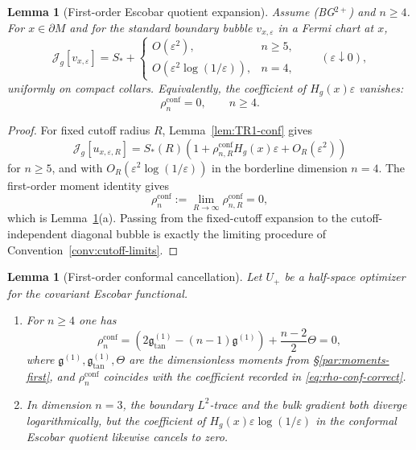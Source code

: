 \documentclass[11pt,reqno,a4paper]{amsart}
\numberwithin{equation}{section}
\theoremstyle{plain}
\newtheorem{lemma}[theorem]{Lemma}
\theoremstyle{remark}
\theoremstyle{plain}
\begin{document}
\begin{lemma}[First-order Escobar quotient expansion]\label{lem:Esc-first-order}
Assume \textup{(BG$^{2+}$)} and $n\ge4$.  For $x\in\partial M$ and for the
standard boundary bubble $v_{x,\varepsilon}$ in a Fermi chart at $x$,
\begin{equation}\label{eq:Esc-first-order}
  \mathcal J_g[v_{x,\varepsilon}]
  = S_\ast+
  \begin{cases}
  O(\varepsilon^2), & n\ge5,\\[1mm]
  O\!\left(\varepsilon^2\log(1/\varepsilon)\right), & n=4,
  \end{cases}
  \qquad (\varepsilon\downarrow0),
\end{equation}
uniformly on compact collars.  Equivalently, the coefficient of
$H_g(x)\varepsilon$ vanishes:
\begin{equation}\label{eq:rho-zero}
\rho_n^{\mathrm{conf}}=0,\qquad n\ge4.
\end{equation}
\end{lemma}

\begin{proof}
For fixed cutoff radius $R$, Lemma~\ref{lem:TR1-conf} gives
\[
\mathcal J_g[u_{x,\varepsilon,R}]
=
S_\ast(R)
\left(
1+\rho_{n,R}^{\mathrm{conf}}H_g(x)\varepsilon
+
O_R(\varepsilon^2)
\right)
\]
for $n\ge5$, and with $O_R(\varepsilon^2\log(1/\varepsilon))$ in the
borderline dimension $n=4$.  The first-order moment identity gives
\[
\rho_n^{\mathrm{conf}}
:=
\lim_{R\to\infty}\rho_{n,R}^{\mathrm{conf}}
=
0,
\]
which is Lemma~\ref{lem:rho-positive}\textup{(a)}.  Passing from the
fixed-cutoff expansion to the cutoff-independent diagonal bubble is exactly
the limiting procedure of Convention~\ref{conv:cutoff-limits}.
\end{proof}


\begin{lemma}[First-order conformal cancellation]\label{lem:rho-positive}
Let $U_+$ be a half-space optimizer for the covariant Escobar functional.

\begin{enumerate}[label=(\alph*),leftmargin=1.25em]
\item For $n\ge4$ one has
\begin{equation}\label{eq:rho-final-closed}
\rho_n^{\mathrm{conf}}
=\left(2\mathfrak g^{(1)}_{\tan}-(n-1)\mathfrak g^{(1)}\right)+\frac{n-2}{2}\Theta
= 0,
\end{equation}
where $\mathfrak g^{(1)},\mathfrak g^{(1)}_{\tan},\Theta$ are the dimensionless moments from \S\ref{par:moments-first}, and $\rho_n^{\mathrm{conf}}$ coincides with the coefficient recorded in \eqref{eq:rho-conf-correct}.

\item In dimension $n=3$, the boundary $L^2$-trace and the bulk gradient both
diverge logarithmically, but the coefficient of
$H_g(x)\varepsilon\log(1/\varepsilon)$ in the conformal Escobar quotient
likewise cancels to zero.
\end{enumerate}
\end{lemma}
\end{document}

